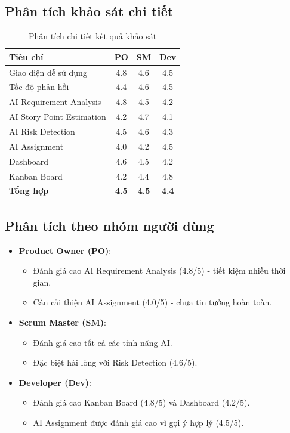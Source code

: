 \documentclass[12pt,a4paper]{report}
\begin{document}
\subsection{Phân tích khảo sát chi tiết}

\begin{table}[H]
\centering
\caption{Phân tích chi tiết kết quả khảo sát}
\begin{tabular}{|p{6cm}|c|c|c|}
\hline
\textbf{Tiêu chí} & \textbf{PO} & \textbf{SM} & \textbf{Dev} \\
\hline
Giao diện dễ sử dụng & 4.8 & 4.6 & 4.5 \\
\hline
Tốc độ phản hồi & 4.4 & 4.6 & 4.5 \\
\hline
AI Requirement Analysis & 4.8 & 4.5 & 4.2 \\
\hline
AI Story Point Estimation & 4.2 & 4.7 & 4.1 \\
\hline
AI Risk Detection & 4.5 & 4.6 & 4.3 \\
\hline
AI Assignment & 4.0 & 4.2 & 4.5 \\
\hline
Dashboard & 4.6 & 4.5 & 4.2 \\
\hline
Kanban Board & 4.2 & 4.4 & 4.8 \\
\hline
\textbf{Tổng hợp} & \textbf{4.5} & \textbf{4.5} & \textbf{4.4} \\
\hline
\end{tabular}
\label{tab:survey_by_role}
\end{table}

\subsection{Phân tích theo nhóm người dùng}

\begin{itemize}
\item \textbf{Product Owner (PO)}:
\begin{itemize}
\item Đánh giá cao AI Requirement Analysis (4.8/5) - tiết kiệm nhiều thời gian.
\item Cần cải thiện AI Assignment (4.0/5) - chưa tin tưởng hoàn toàn.
\end{itemize}

\item \textbf{Scrum Master (SM)}:
\begin{itemize}
\item Đánh giá cao tất cả các tính năng AI.
\item Đặc biệt hài lòng với Risk Detection (4.6/5).
\end{itemize}

\item \textbf{Developer (Dev)}:
\begin{itemize}
\item Đánh giá cao Kanban Board (4.8/5) và Dashboard (4.2/5).
\item AI Assignment được đánh giá cao vì gợi ý hợp lý (4.5/5).
\end{itemize}
\end{itemize}
\end{document}
